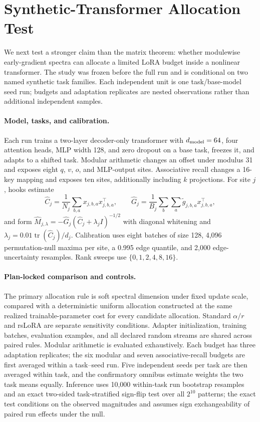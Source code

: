 \documentclass[10pt,twocolumn]{article}
\theoremstyle{definition}
\begin{document}
\section{Synthetic-Transformer Allocation Test}
\label{sec:transformer-results}

We next test a stronger claim than the matrix theorem: whether modulewise early-gradient spectra can allocate a limited LoRA budget inside a nonlinear transformer.  The study was frozen before the full run and is conditional on two named synthetic task families.  Each independent unit is one task/base-model seed run; budgets and adaptation replicates are nested observations rather than additional independent samples.

\paragraph{Model, tasks, and calibration.}
Each run trains a two-layer decoder-only transformer with $d_{\rm model}=64$, four attention heads, MLP width 128, and zero dropout on a base task, freezes it, and adapts to a shifted task.  Modular arithmetic changes an offset under modulus 31 and exposes eight $q$, $v$, $o$, and MLP-output sites.  Associative recall changes a 16-key mapping and exposes ten sites, additionally including $k$ projections.  For site $j$, hooks estimate
\begin{equation}
    \widehat C_j=\frac1{N_j}\sum_{b,a}x_{j,b,a}x_{j,b,a}^{\top},\qquad
    \widehat G_j=\frac1{B_j}\sum_b\sum_a \widetilde g_{j,b,a}x_{j,b,a}^{\top},
\end{equation}
and form $\widehat M_{j,\lambda}=-\widehat G_j(\widehat C_j+\lambda_j I)^{-1/2}$ with diagonal whitening and $\lambda_j=0.01\operatorname{tr}(\widehat C_j)/d_j$.  Calibration uses eight batches of size 128, 4,096 permutation-null maxima per site, a 0.995 edge quantile, and 2,000 edge-uncertainty resamples.  Rank sweeps use $\{0,1,2,4,8,16\}$.

\paragraph{Plan-locked comparison and controls.}
The primary allocation rule is soft spectral dimension under fixed update scale, compared with a deterministic uniform allocation constructed at the same realized trainable-parameter cost for every candidate allocation.  Standard $\alpha/r$ and rsLoRA are separate sensitivity conditions.  Adapter initialization, training batches, evaluation examples, and all declared random streams are shared across paired rules.  Modular arithmetic is evaluated exhaustively.  Each budget has three adaptation replicates; the six modular and seven associative-recall budgets are first averaged within a task--seed run.  Five independent seeds per task are then averaged within task, and the confirmatory omnibus estimate weights the two task means equally.  Inference uses 10,000 within-task run bootstrap resamples and an exact two-sided task-stratified sign-flip test over all $2^{10}$ patterns; the exact test conditions on the observed magnitudes and assumes sign exchangeability of paired run effects under the null.
\end{document}
